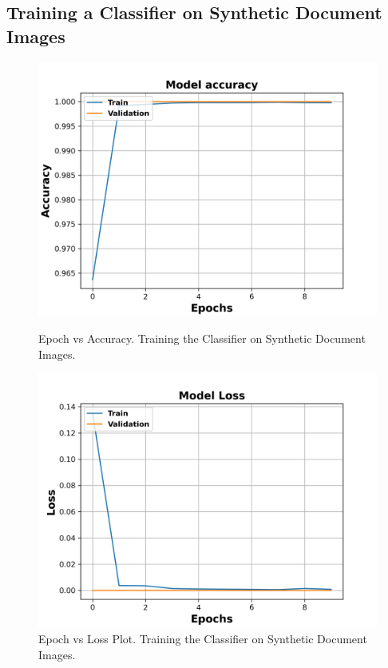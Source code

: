 \subsection{Training a Classifier on Synthetic Document Images}\label{trainingsyntheticclassifier}



\begin{figure}[H]
  \centering
  \begin{minipage}[b]{0.49\textwidth}
    \includegraphics[width=\textwidth]{images/Synthetic_Data_Classifier_2021-05-21_13-52-04_Accuracy.png}
    \caption[Epoch vs Accuracy Plot. Training the Classifier on Synthetic Document Images.]{Epoch vs Accuracy. Training the Classifier on Synthetic Document Images.}
    \label{fig:SyntheticClassifierAcc}
  \end{minipage}
  \hfill
  \begin{minipage}[b]{0.49\textwidth}
    \includegraphics[width=\textwidth]{images/Synthetic_Data_Classifier_2021-05-21_13-52-04_Loss.png}
    \caption[Epoch vs Loss Plot. Training the Classifier on Synthetic Document Images.]{Epoch vs Loss Plot. Training the Classifier on Synthetic Document Images.}
    \label{fig:SyntheticClassifierLoss}
  \end{minipage}
\end{figure}


